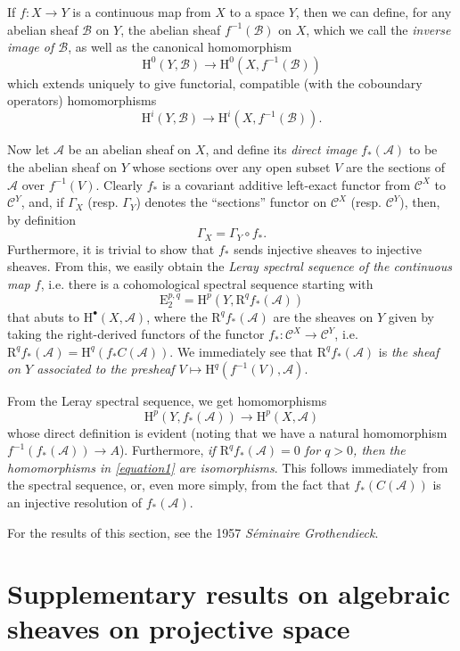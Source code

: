 \documentclass{article}
\theoremstyle{plain}
\theoremstyle{definition}
\newcommand{\sh}{\mathscr}
\newcommand{\cat}{\mathcal}
\newcommand{\HH}{\mathrm{H}}
\newcommand{\EE}{\mathrm{E}}
\newcommand{\RR}{\mathrm{R}}
\newcommand{\oldpage}[1]{\marginpar{\footnotesize$\Big\vert$ \textit{p.~#1}}}
\begin{document}
If $f\colon X\to Y$ is a continuous map from $X$ to a space $Y$, then we can define, for any abelian sheaf $\sh{B}$ on $Y$, the abelian sheaf $f^{-1}(\sh{B})$ on $X$, which we call the \emph{inverse image of $\sh{B}$}, as well as the canonical homomorphism
\[
  \HH^0(Y,\sh{B}) \to \HH^0(X,f^{-1}(\sh{B}))
\]
which extends uniquely to give functorial, compatible (with the coboundary operators) homomorphisms
\[
  \HH^i(Y,\sh{B}) \to \HH^i(X,f^{-1}(\sh{B})).
\]

Now let $\sh{A}$ be an abelian sheaf on $X$, and define its \emph{direct image} $f_*(\sh{A})$ to be the abelian sheaf on $Y$ whose sections over any open subset $V$ are the sections of $\sh{A}$ over $f^{-1}(V)$.
Clearly $f_*$ is a covariant additive left-exact functor from $\cat{C}^X$ to $\cat{C}^Y$, and, if $\Gamma_X$ (resp. $\Gamma_Y$) denotes the ``sections'' functor on $\cat{C}^X$ (resp. $\cat{C}^Y$), then, by definition
\[
  \Gamma_X = \Gamma_Y\circ f_*.
\]
Furthermore, it is trivial to show that $f_*$ sends injective sheaves to injective sheaves.
From this, we easily obtain the \emph{Leray spectral sequence of the continuous map $f$}, i.e. there is a cohomological spectral sequence starting with
\[
  \EE_2^{p,q} = \HH^p(Y,\RR^qf_*(\sh{A}))
\]
that abuts to $\HH^\bullet(X,\sh{A})$, where the $\RR^qf_*(\sh{A})$ are the sheaves on $Y$ given by taking the right-derived functors of the functor $f_*\colon\cat{C}^X\to\cat{C}^Y$, i.e. $\RR^qf_*(\sh{A}) = \HH^q(f_*C(\sh{A}))$.
We immediately see that $\RR^qf_*(\sh{A})$ is \emph{the sheaf on $Y$ associated to the presheaf $V\mapsto\HH^q(f^{-1}(V),\sh{A})$}.

From the Leray spectral sequence, we get homomorphisms
\[
\label{equation1}
  \HH^p(Y,f_*(\sh{A})) \to \HH^p(X,\sh{A})
  \tag{1}
\]
whose direct definition is evident (noting that we have a natural homomorphism $f^{-1}(f_*(\sh{A}))\to A$).
Furthermore, \emph{if $\RR^qf_*(\sh{A})=0$ for $q>0$, then the}
\oldpage{2-06}
\emph{homomorphisms in \cref{equation1} are isomorphisms}.
This follows immediately from the spectral sequence, or, even more simply, from the fact that $f_*(C(\sh{A}))$ is an injective resolution of $f_*(\sh{A})$.

For the results of this section, see the 1957 \emph{Séminaire Grothendieck}.


\section{Supplementary results on algebraic sheaves on projective space}
\label{section4}
\end{document}
